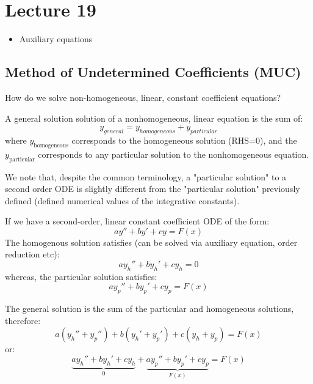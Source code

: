 \chapter*{Lecture 19}
\begin{recall}{}{}
\begin{itemize}
\item Auxiliary equations
\end{itemize}
\end{recall}





\section{Method of Undetermined Coefficients (MUC)}
How do we solve non-homogeneous, linear, constant coefficient  equations? 


A general solution solution of a nonhomogeneous, linear equation is the sum of:
\begin{equation}
\boxed{y_{general}=y_{homogeneous} + y_{particular}}
\end{equation}
where $y_\text{homogeneous}$ corresponds to the homogeneous solution (RHS=0), and the $y_\text{particular}$ corresponds to any particular solution to the nonhomogeneous equation.

We note that, despite the common terminology, a  "particular solution" to a second order ODE is slightly different from the "particular solution" previously defined (defined numerical values of the integrative constants).



If we have a second-order, linear constant coefficient ODE of the form:
\begin{equation*}
ay''+by'+cy=F(x)
\end{equation*}
The homogenous solution satisfies (can be solved via auxiliary equation, order reduction etc):
\begin{equation*}
ay_h''+by_h'+cy_h=0
\end{equation*}
whereas, the particular solution satisfies:
\begin{equation*}
ay_p''+by_p'+cy_p=F(x)
\end{equation*}

The general solution is the sum of the particular and homogeneous solutions, therefore:
\begin{equation*}
a(y_h''+y_p'')+b(y_h'+y_p')+c(y_h+y_p)=F(x)
\end{equation*}
or:
\begin{equation*}
\underbrace{ay_h''+by_h'+cy_h}_0 + \underbrace{ay_p''+by_p'+cy_p}_{F(x)}=F(x)
\end{equation*}


